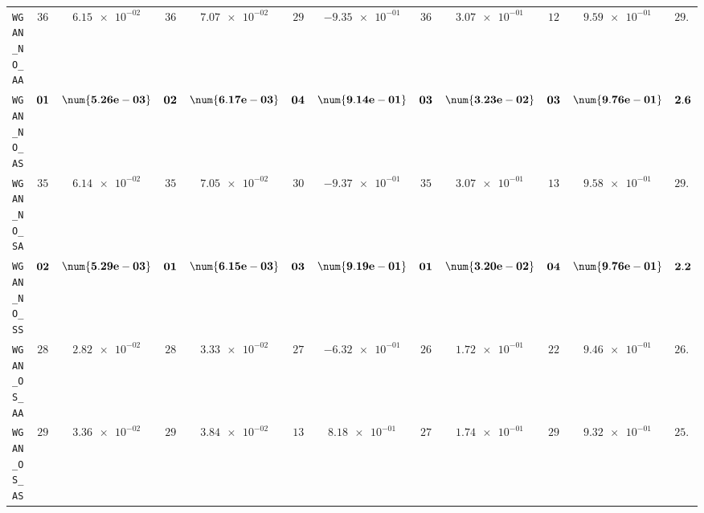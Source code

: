 \begin{xltabular}{\textwidth}{l||cC|cC|cC|cC|cC||c}
	\texttt{WGAN\_NO\_AA} & $ 36$ & $ \num{6.15e-02}$ & $ 36$ & $ \num{7.07e-02}$ & $ 29$ & $ \num{-9.35e-01}$ & $ 36$ & $ \num{3.07e-01}$ & $ 12$ & $ \num{9.59e-01}$ & $ 29.8$  \\
	\texttt{WGAN\_NO\_AS} & $\bf 01$ & $\bf \num{5.26e-03}$ & $\bf 02$ & $\bf \num{6.17e-03}$ & $\bf 04$ & $\bf \num{9.14e-01}$ & $\bf 03$ & $\bf \num{3.23e-02}$ & $\bf 03$ & $\bf \num{9.76e-01}$ & $\bf 2.6$  \\
	\texttt{WGAN\_NO\_SA} & $ 35$ & $ \num{6.14e-02}$ & $ 35$ & $ \num{7.05e-02}$ & $ 30$ & $ \num{-9.37e-01}$ & $ 35$ & $ \num{3.07e-01}$ & $ 13$ & $ \num{9.58e-01}$ & $ 29.6$  \\
	\texttt{WGAN\_NO\_SS} & $\bf 02$ & $\bf \num{5.29e-03}$ & $\bf 01$ & $\bf \num{6.15e-03}$ & $\bf 03$ & $\bf \num{9.19e-01}$ & $\bf 01$ & $\bf \num{3.20e-02}$ & $\bf 04$ & $\bf \num{9.76e-01}$ & $\bf 2.2$  \\
	\texttt{WGAN\_OS\_AA} & $ 28$ & $ \num{2.82e-02}$ & $ 28$ & $ \num{3.33e-02}$ & $ 27$ & $ \num{-6.32e-01}$ & $ 26$ & $ \num{1.72e-01}$ & $ 22$ & $ \num{9.46e-01}$ & $ 26.2$  \\
	\texttt{WGAN\_OS\_AS} & $ 29$ & $ \num{3.36e-02}$ & $ 29$ & $ \num{3.84e-02}$ & $ 13$ & $ \num{8.18e-01}$ & $ 27$ & $ \num{1.74e-01}$ & $ 29$ & $ \num{9.32e-01}$ & $ 25.4$  \\

\end{xltabular}
